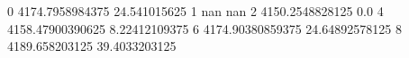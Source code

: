 0 4174.7958984375 24.541015625
1 nan nan
2 4150.2548828125 0.0
4 4158.47900390625 8.22412109375
6 4174.90380859375 24.64892578125
8 4189.658203125 39.4033203125

